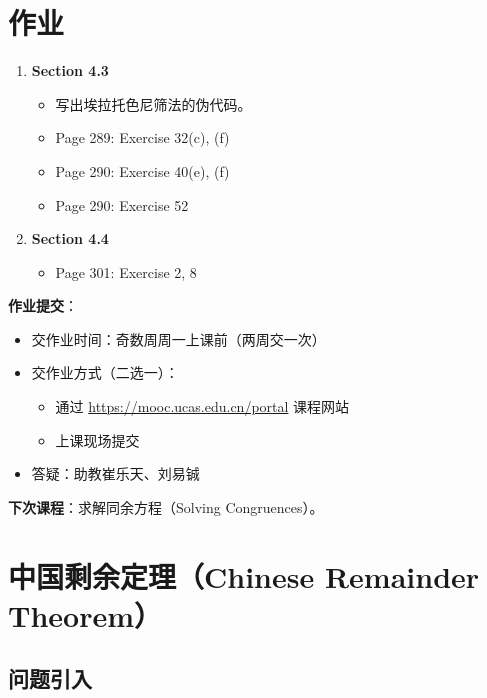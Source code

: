 \documentclass[UTF8,11pt,a4paper]{ctexbook}   %
\theoremstyle{definition}
\begin{document}
\section{作业}

\begin{enumerate}
    \item \textbf{Section 4.3}
    \begin{itemize}
        \item 写出埃拉托色尼筛法的伪代码。
        \item Page 289: Exercise 32(c), (f)
        \item Page 290: Exercise 40(e), (f)
        \item Page 290: Exercise 52
    \end{itemize}
    \item \textbf{Section 4.4}
    \begin{itemize}
        \item Page 301: Exercise 2, 8
    \end{itemize}
\end{enumerate}

\textbf{作业提交}：
\begin{itemize}
    \item 交作业时间：奇数周周一上课前（两周交一次）
    \item 交作业方式（二选一）：
    \begin{itemize}
        \item 通过 \url{https://mooc.ucas.edu.cn/portal} 课程网站
        \item 上课现场提交
    \end{itemize}
    \item 答疑：助教崔乐天、刘易铖
\end{itemize}

\textbf{下次课程}：求解同余方程（Solving Congruences）。

\newpage
\section{中国剩余定理（Chinese Remainder Theorem）}

\subsection{问题引入}
\end{document}
